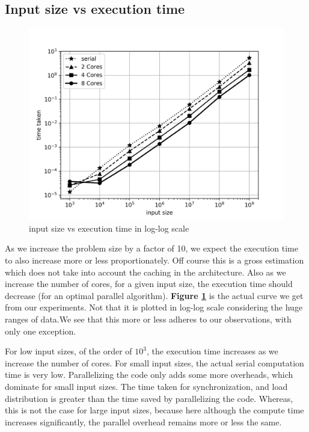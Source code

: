 \documentclass[12,a4paper]{article}
\begin{document}
    \subsection{Input size vs execution time}
    \begin{figure}[H]
        \centering
        \includegraphics[width=\textwidth]{time.png}
        \caption{input size vs execution time in log-log scale}
        \label{fig:q1p2}
    \end{figure}
    As we increase the problem size by a factor of 10, we expect the execution time to also increase more or less proportionately. Off course this is a gross estimation which does not take into account the caching in the architecture. Also as we increase the number of cores, for a given input size, the execution time should decrease (for an optimal parallel algorithm). \textbf{Figure \ref{fig:q1p2}} is the actual curve we get from our experiments. Not that it is plotted in log-log scale considering the huge ranges of data.We see that this more or less adheres to our observations, with only one exception.
    
    For low input sizes, of the order of $10^3$, the execution time increases as we increase the number of cores. For small input sizes, the actual serial computation time is very low. Parallelizing the code only adds some more overheads, which dominate for small input sizes. The time taken for synchronization, and load distribution is greater than the time saved by parallelizing the code. Whereas, this is not the case for large input sizes, because here although the compute time increases significantly, the parallel overhead remains more or less the same.
    \newpage
\end{document}
